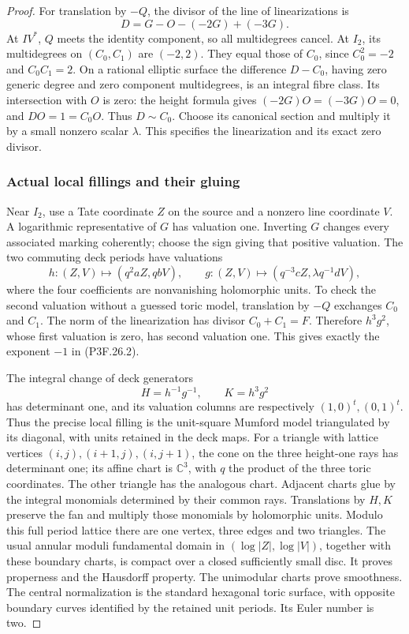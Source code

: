 \begin{proof}
For translation by \(-Q\), the divisor of the line of linearizations is \[
 D=G-O-(-2G)+(-3G).
\] At \(IV^*\), \(Q\) meets the identity component, so all multidegrees cancel. At \(I_2\), its multidegrees on \((C_0,C_1)\) are \((-2,2)\). They equal those of \(C_0\), since \(C_0^2=-2\) and \(C_0C_1=2\). On a rational elliptic surface the difference \(D-C_0\), having zero generic degree and zero component multidegrees, is an integral fibre class. Its intersection with \(O\) is zero: the height formula gives \((-2G)O=(-3G)O=0\), and \(DO=1=C_0O\). Thus \(D\sim C_0\). Choose its canonical section and multiply it by a small nonzero scalar \(\lambda\). This specifies the linearization and its exact zero divisor.

\subsubsection{Actual local fillings and their gluing}\label{actual-local-fillings-and-their-gluing}

Near \(I_2\), use a Tate coordinate \(Z\) on the source and a nonzero line coordinate \(V\). A logarithmic representative of \(G\) has valuation one. Inverting \(G\) changes every associated marking coherently; choose the sign giving that positive valuation. The two commuting deck periods have valuations \[
 h:(Z,V)\longmapsto(q^2aZ,qbV),\qquad
 g:(Z,V)\longmapsto(q^{-3}cZ,\lambda q^{-1}dV),       \tag{P3F.26.2}
\] where the four coefficients are nonvanishing holomorphic units. To check the second valuation without a guessed toric model, translation by \(-Q\) exchanges \(C_0\) and \(C_1\). The norm of the linearization has divisor \(C_0+C_1=F\). Therefore \(h^3g^2\), whose first valuation is zero, has second valuation one. This gives exactly the exponent \(-1\) in (P3F.26.2).

The integral change of deck generators \[
 H=h^{-1}g^{-1},\qquad K=h^3g^2
\] has determinant one, and its valuation columns are respectively \((1,0)^t,(0,1)^t\). Thus the precise local filling is the unit-square Mumford model triangulated by its diagonal, with units retained in the deck maps. For a triangle with lattice vertices \((i,j),(i+1,j),(i,j+1)\), the cone on the three height-one rays has determinant one; its affine chart is \(\mathbb C^3\), with \(q\) the product of the three toric coordinates. The other triangle has the analogous chart. Adjacent charts glue by the integral monomials determined by their common rays. Translations by \(H,K\) preserve the fan and multiply those monomials by holomorphic units. Modulo this full period lattice there are one vertex, three edges and two triangles. The usual annular moduli fundamental domain in \((\log|Z|,\log|V|)\), together with these boundary charts, is compact over a closed sufficiently small disc. It proves properness and the Hausdorff property. The unimodular charts prove smoothness. The central normalization is the standard hexagonal toric surface, with opposite boundary curves identified by the retained unit periods. Its Euler number is two.


\end{proof}
